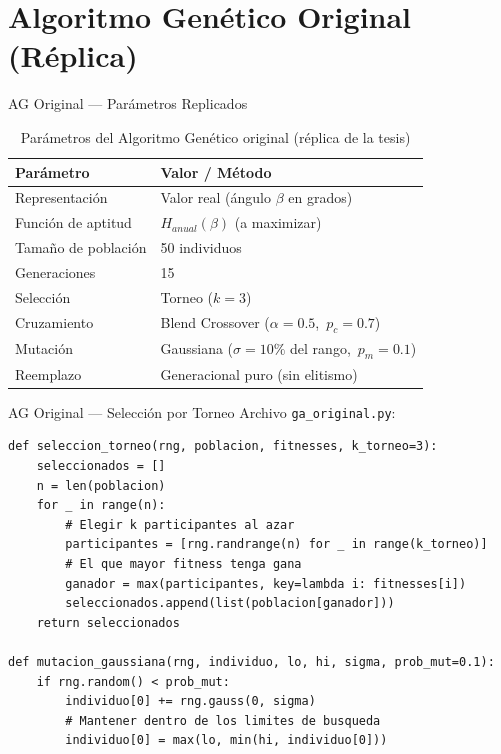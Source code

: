 \documentclass[10pt]{beamer}
\begin{document}
\section{Algoritmo Genético Original (Réplica)}
\begin{frame}{AG Original — Parámetros Replicados}
  \small
  \begin{table}
    \centering
    \caption{Parámetros del Algoritmo Genético original (réplica de la tesis)}
    \begin{tabular}{ll}
      \toprule
      \textbf{Parámetro} & \textbf{Valor / Método} \\
      \midrule
      Representación      & Valor real (ángulo $\beta$ en grados)           \\
      Función de aptitud  & $H_{anual}(\beta)$ (a maximizar)                 \\
      Tamaño de población & 50 individuos                                    \\
      Generaciones        & 15                                               \\
      Selección           & Torneo ($k = 3$)                                 \\
      Cruzamiento         & Blend Crossover ($\alpha=0.5$,\ $p_c=0.7$)      \\
      Mutación            & Gaussiana ($\sigma=10\%$ del rango,\ $p_m=0.1$) \\
      Reemplazo           & Generacional puro (sin elitismo)                 \\
      \bottomrule
    \end{tabular}
  \end{table}
\end{frame}

\begin{frame}[fragile]{AG Original — Selección por Torneo}
  Archivo \texttt{ga\_original.py}:

  \begin{lstlisting}
def seleccion_torneo(rng, poblacion, fitnesses, k_torneo=3):
    seleccionados = []
    n = len(poblacion)
    for _ in range(n):
        # Elegir k participantes al azar
        participantes = [rng.randrange(n) for _ in range(k_torneo)]
        # El que mayor fitness tenga gana
        ganador = max(participantes, key=lambda i: fitnesses[i])
        seleccionados.append(list(poblacion[ganador]))
    return seleccionados

def mutacion_gaussiana(rng, individuo, lo, hi, sigma, prob_mut=0.1):
    if rng.random() < prob_mut:
        individuo[0] += rng.gauss(0, sigma)
        # Mantener dentro de los limites de busqueda
        individuo[0] = max(lo, min(hi, individuo[0]))
  \end{lstlisting}
\end{frame}
\end{document}
